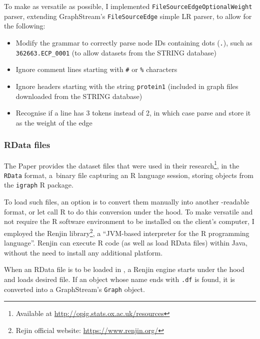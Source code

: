 

To make \graffs as versatile as possible, I implemented \texttt{FileSourceEdgeOptionalWeight} parser, extending GraphStream's \texttt{FileSourceEdge} simple LR parser, to allow for the following:
\begin{itemize}[topsep=5pt,itemsep=-2pt]
    \item Modify the grammar to correctly parse node IDs containing dots (\texttt{.}), such as \texttt{362663.ECP\_0001} (to allow datasets from the STRING database)
    \item Ignore comment lines starting with \texttt{\#} or \texttt{\%} characters
    \item Ignore headers starting with the string \texttt{protein1} (included in graph files downloaded from the STRING database)
    \item Recognise if a line has 3 tokens instead of 2, in which case parse and store it as the weight of the edge
\end{itemize}

\subsubsection*{RData files}\label{sec:rdata_files}

The Paper provides the dataset files that were used in their research\footnote{Available at \url{http://opig.stats.ox.ac.uk/resources}}, in the \texttt{RData} format, a~binary file capturing an R language session, storing objects from the \texttt{igraph} R package.

To load such files, an option is to convert them manually into another \graffs-readable format, or let \graffs call R to do this conversion under the hood.
To make \graffs versatile and not require the R software environment to be installed on the client's computer, I employed the Renjin library\footnote{Rejin official website: \url{https://www.renjin.org/}}, a \enquote{JVM-based interpreter for the R programming language}.
Renjin can execute R code (as well as load RData files) within Java, without the need to install any additional platform.

When an RData file is to be loaded in \graffs, a Renjin engine starts under the hood and loads desired file.
If an object whose name ends with \texttt{.df}\footnotemark{} is found, it is converted into a GraphStream's \texttt{Graph} object.

